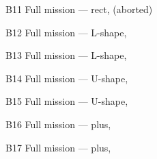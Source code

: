 \documentclass[aspectratio=169,11pt,t]{beamer}
\begin{document}
\begin{frame}{B11 \textperiodcentered{} Full mission --- rect, \lqr{} (aborted)}
  \centering{}
\end{frame}
\begin{frame}{B12 \textperiodcentered{} Full mission --- L-shape, \hinf}
  \centering{}
\end{frame}
\begin{frame}{B13 \textperiodcentered{} Full mission --- L-shape, \lqr}
  \centering{}
\end{frame}
\begin{frame}{B14 \textperiodcentered{} Full mission --- U-shape, \hinf}
  \centering{}
\end{frame}
\begin{frame}{B15 \textperiodcentered{} Full mission --- U-shape, \lqr}
  \centering{}
\end{frame}
\begin{frame}{B16 \textperiodcentered{} Full mission --- plus, \hinf}
  \centering{}
\end{frame}
\begin{frame}{B17 \textperiodcentered{} Full mission --- plus, \lqr}
  \centering{}
\end{frame}
\end{document}
